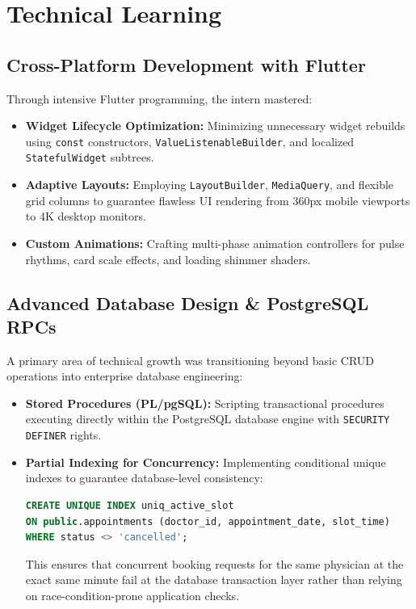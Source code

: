 \documentclass[11pt,a4paper,oneside]{report}
\begin{document}
\chapter{Technical Learning}

\section{Cross-Platform Development with Flutter}
Through intensive Flutter programming, the intern mastered:
\begin{itemize}
    \item \textbf{Widget Lifecycle Optimization:} Minimizing unnecessary widget rebuilds using \texttt{const} constructors, \texttt{ValueListenableBuilder}, and localized \texttt{StatefulWidget} subtrees.
    \item \textbf{Adaptive Layouts:} Employing \texttt{LayoutBuilder}, \texttt{MediaQuery}, and flexible grid columns to guarantee flawless UI rendering from 360px mobile viewports to 4K desktop monitors.
    \item \textbf{Custom Animations:} Crafting multi-phase animation controllers for pulse rhythms, card scale effects, and loading shimmer shaders.
\end{itemize}

\section{Advanced Database Design \& PostgreSQL RPCs}
A primary area of technical growth was transitioning beyond basic CRUD operations into enterprise database engineering:
\begin{itemize}
    \item \textbf{Stored Procedures (PL/pgSQL):} Scripting transactional procedures executing directly within the PostgreSQL database engine with \texttt{SECURITY DEFINER} rights.
    \item \textbf{Partial Indexing for Concurrency:} Implementing conditional unique indexes to guarantee database-level consistency:
    \begin{lstlisting}[language=SQL]
CREATE UNIQUE INDEX uniq_active_slot 
ON public.appointments (doctor_id, appointment_date, slot_time)
WHERE status <> 'cancelled';
    \end{lstlisting}
    This ensures that concurrent booking requests for the same physician at the exact same minute fail at the database transaction layer rather than relying on race-condition-prone application checks.
\end{itemize}
\end{document}

